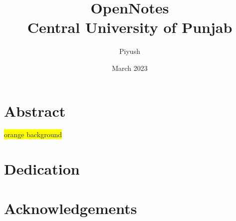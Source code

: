 \documentclass[11pt]{report}
\title{\textbf{\Large{Open\:Notes}}\\
{\Large Central University of Punjab}}
\author{Piyush}
\date{March 2023}
\begin{document}
\maketitle
\chapter*{Abstract}
\colorbox{yellow}{orange background}
\chapter*{Dedication}
\chapter*{Acknowledgements}

\tableofcontents
\listoffigures
\renewcommand\listoflistingscaption{List of codes}
\listoflistings %


\appendix




\end{document}
